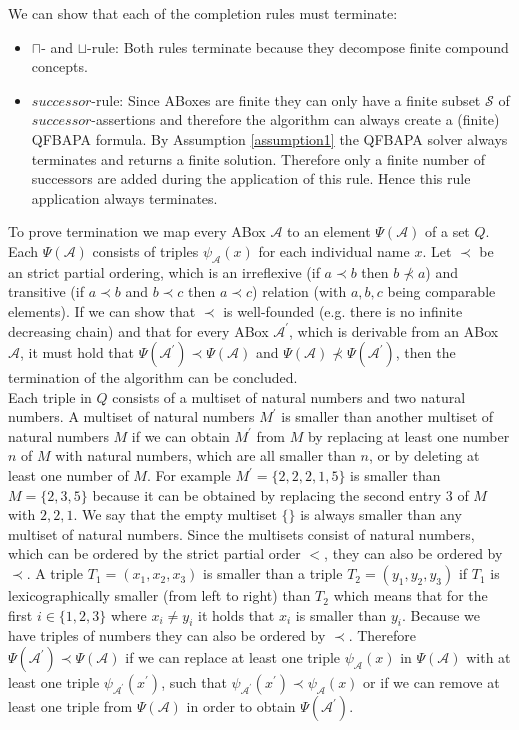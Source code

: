\documentclass{book}
\theoremstyle{break}
\theoremstyle{definition}
\begin{document}
We can show that each of the completion rules must terminate:
\begin{itemize}
\item $\sqcap$- and $\sqcup$-rule: Both rules terminate because they decompose finite compound concepts.
\item $successor$-rule: Since ABoxes are finite they can only have a finite subset $\mathcal{S}$ of $successor$-assertions and therefore the algorithm can always create a (finite) QFBAPA formula. By Assumption \ref{assumption1}  the QFBAPA solver always terminates and returns a finite solution. Therefore only a finite number of successors are added during the application of this rule. Hence this rule application always terminates.
\end{itemize}
To prove termination we map every ABox $\mathcal{A}$ to an element $\Psi(\mathcal{A})$ of a set $Q$. Each $\Psi(\mathcal{A})$ consists of triples $\psi_\mathcal{A}(x)$ for each individual name $x$. Let $\prec$ be an strict partial ordering, which is an irreflexive (if $a\prec b$ then $b\not\prec a$) and transitive (if $a\prec b$ and $b\prec c$ then $a\prec c$) relation (with $a,b,c$ being comparable elements). If we can show that $\prec$ is well-founded (e.g. there is no infinite decreasing chain) and that for every ABox $\mathcal{A}^\prime$, which is derivable from an ABox $\mathcal{A}$, it must hold that $\Psi(\mathcal{A}^\prime)\prec\Psi(\mathcal{A})$ and $\Psi(\mathcal{A})\not\prec\Psi(\mathcal{A}^\prime)$, then the termination of the algorithm can be concluded.\\
Each triple in $Q$ consists of a multiset of natural numbers and two natural numbers. A multiset of natural numbers $M^\prime$ is smaller than another multiset of natural numbers $M$ if we can obtain $M^\prime$ from $M$ by replacing at least one number $n$ of $M$ with natural numbers, which are all smaller than $n$, or by deleting at least one number of $M$. For example $M^\prime=\{2,2,2,1,5\}$ is smaller than $M=\{2,3,5\}$ because it can be obtained by replacing the second entry $3$ of $M$ with $2,2,1$. We say that the empty multiset $\{\}$ is always smaller than any multiset of natural numbers. Since the multisets consist of natural numbers, which can be ordered by the strict partial order $<$, they can also be ordered by $\prec$. A triple $T_1=(x_1,x_2, x_3)$ is smaller than a triple $T_2=(y_1,y_2,y_3)$ if $T_1$ is lexicographically smaller (from left to right) than $T_2$ which means that for the first $i\in\{1,2,3\}$ where $x_i\neq y_i$ it holds that $x_i$ is smaller than $y_i$. Because we have triples of numbers they can also be ordered by $\prec$. Therefore $\Psi(\mathcal{A}^\prime)\prec\Psi(\mathcal{A})$ if we can replace at least one triple $\psi_\mathcal{A}(x)$ in $\Psi(\mathcal{A})$ with at least one triple $\psi_{\mathcal{A}^\prime}(x^\prime)$, such that $\psi_\mathcal{A^\prime}(x^\prime)\prec\psi_{\mathcal{A}}(x)$ or if we can remove at least one triple from $\Psi(\mathcal{A})$ in order to obtain $\Psi(\mathcal{A}^\prime)$.\\
\end{document}
